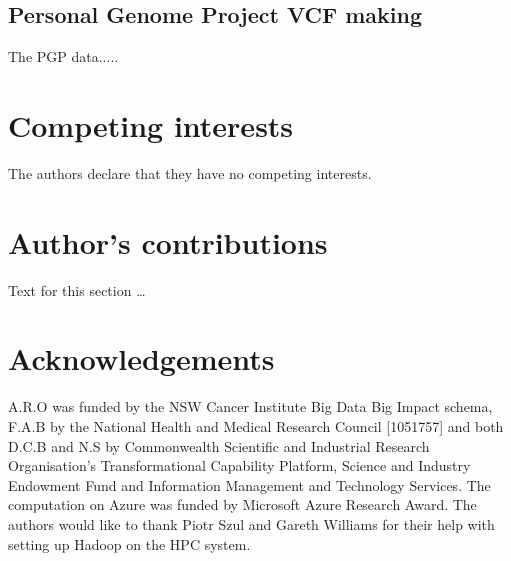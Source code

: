 \documentclass{bmcart}
\begin{document}
\subsection*{Personal Genome Project VCF making}
The PGP data..... 


\begin{backmatter}

\section*{Competing interests}
  The authors declare that they have no competing interests.

\section*{Author's contributions}
    Text for this section \ldots

\section*{Acknowledgements}
  A.R.O was funded by the NSW Cancer Institute Big Data Big Impact schema, F.A.B by the National Health and Medical Research Council [1051757] and both D.C.B and N.S by Commonwealth Scientific and Industrial Research Organisation's Transformational Capability Platform, Science and Industry Endowment Fund and Information Management and Technology Services. The computation on Azure was funded by Microsoft Azure Research Award. 
The authors would like to thank Piotr Szul and Gareth Williams for their help with setting up Hadoop on the HPC system.



\end{backmatter}
\end{document}
